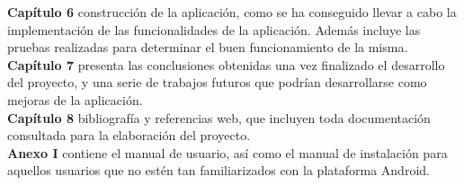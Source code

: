 \documentclass[../pfc.tex]{subfiles}
\begin{document}
  \textbf{Capítulo 6} construcción de la aplicación, como se ha conseguido llevar a cabo la implementación de las funcionalidades de la aplicación. Además incluye las pruebas realizadas para determinar el buen funcionamiento de la misma.\\
  
  \textbf{Capítulo 7} presenta las conclusiones obtenidas una vez finalizado el desarrollo del proyecto, y una serie de trabajos futuros que podrían desarrollarse como mejoras de la aplicación.\\
  
  \textbf{Capítulo 8} bibliografía y referencias web, que incluyen toda documentación consultada para la elaboración del proyecto.\\ 
  
  \textbf{Anexo I} contiene el manual de usuario, así como el manual de instalación para aquellos usuarios que no estén tan familiarizados con la plataforma Android.\\

 
\end{document}

